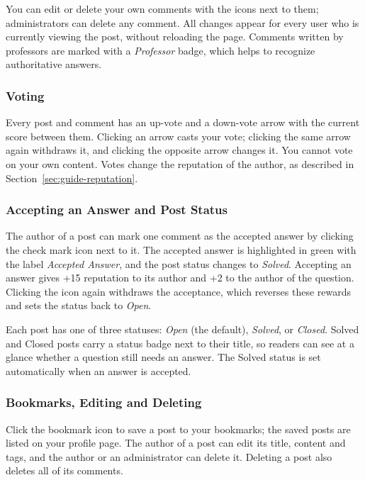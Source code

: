 You can edit or delete your own comments with the icons next to them; administrators
can delete any comment. All changes appear for every user who is currently viewing the
post, without reloading the page. Comments written by professors are marked with a
\emph{Professor} badge, which helps to recognize authoritative answers.

\subsubsection*{Voting}

Every post and comment has an up-vote and a down-vote arrow with the current score
between them. Clicking an arrow casts your vote; clicking the same arrow again
withdraws it, and clicking the opposite arrow changes it. You cannot vote on your own
content. Votes change the reputation of the author, as described in
Section~\ref{sec:guide-reputation}.

\subsubsection*{Accepting an Answer and Post Status}

The author of a post can mark one comment as the accepted answer by clicking the check
mark icon next to it. The accepted answer is highlighted in green with the label
\emph{Accepted Answer}, and the post status changes to \emph{Solved}. Accepting an
answer gives +15 reputation to its author and +2 to the author of the question. Clicking
the icon again withdraws the acceptance, which reverses these rewards and sets the
status back to \emph{Open}.

Each post has one of three statuses: \emph{Open} (the default), \emph{Solved}, or
\emph{Closed}. Solved and Closed posts carry a status badge next to their title, so
readers can see at a glance whether a question still needs an answer. The Solved status
is set automatically when an answer is accepted.

\subsubsection*{Bookmarks, Editing and Deleting}

Click the bookmark icon to save a post to your bookmarks; the saved posts are listed on
your profile page. The author of a post can edit its title, content and tags, and the
author or an administrator can delete it. Deleting a post also deletes all of its
comments.

